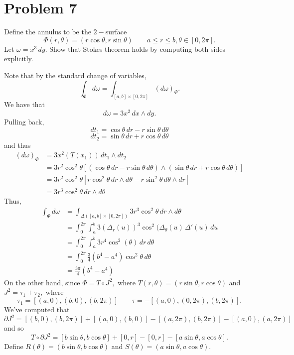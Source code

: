 \documentclass[11pt]{article}
\begin{document}
\section*{Problem 7}
\begin{problem}
    Define the annulus to be the $2-$surface 
    \[\Phi(r,\theta) = (r\cos \theta, r\sin \theta)\qquad a\leq r\leq b, \theta \in [0,2\pi].\]Let $\omega = x^3\,dy.$ Show that Stokes theorem holds by computing both sides explicitly.
\end{problem}
\begin{solution}
Note that by the standard change of variables, 
\[\int_{\Phi}d\omega = \int_{[a,b]\times [0,2\pi]}(d\omega)_\Phi.\] 
We have that 
    \[d\omega = 3x^2\,dx \wedge dy.\] 
Pulling back, 
\[dt_1 = \cos \theta \,dr -r\sin\theta\,d\theta\]
\[dt_2 = \sin\theta\,dr + r\cos\theta\,d\theta\] and thus 
\begin{align*}
    (d\omega)_\Phi &= 3x^2(T(x_1))\,dt_1 \wedge dt_2\\
    &= 3r^2\cos^2\theta \left[(\cos \theta \,dr -r\sin\theta\,d\theta) \wedge (\sin\theta\,dr + r\cos\theta\,d\theta)\right]\\
    &= 3r^2\cos^2\theta[r\cos^2\theta\,dr\wedge d\theta - r\sin^2\theta\,d\theta \wedge dr]\\
    &= 3r^3\cos^2 \theta \,dr\wedge d\theta
\end{align*}
Thus, 
\begin{align*}
\int_{\Phi}d\omega &= \int_{\Delta([a,b]\times [0,2\pi])}3r^3\cos^2 \theta \,dr\wedge d\theta\\ &= \int_0^{2\pi}\int_a^b 3(\Delta_r(u))^3 \cos^2(\Delta_\theta(u)\, \Delta'(u)\,du\\ &= \int_0^{2\pi}\int_a^b 3r^4 \cos^2(\theta)\,dr\,d\theta   \\
&= \int_0^{2\pi} \frac{3}{4}(b^4 - a^4)\cos^2\theta \,d\theta\\
&= \frac{3\pi}{4}(b^4 - a^4)
\end{align*}
On the other hand, since $\Phi = T\circ J^2,$ where $T(r,\theta) = (r\sin\theta, r\cos \theta)$ and $J^2= \tau_1 + \tau_2, $ where 
\[\tau_1 = [(a,0), (b,0), (b, 2\pi)]\qquad \tau = -[(a,0), (0,2\pi), (b, 2\pi)].\] We've computed that 
\[\partial J^2 = [(b,0), (b, 2\pi)] + [(a,0), (b, 0)] - [(a,2\pi), (b, 2\pi)] - [(a,0), (a,2\pi)]\] and so 
\[T\circ \partial J^2 = [b\sin\theta, b\cos \theta] + [0, r] - [0, r] - [a\sin\theta, a\cos\theta].\] Define $R(\theta)= (b\sin\theta, b\cos\theta)$ and $S(\theta) = (a\sin\theta, a\cos \theta).$
\begin{align*}

\end{align*}
\end{solution}
\end{document}
